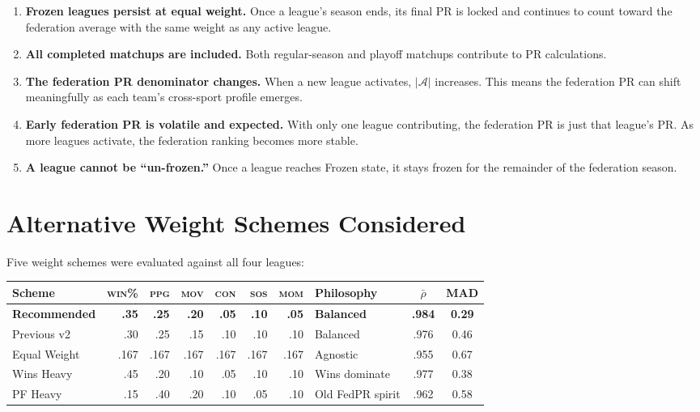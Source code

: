 \documentclass[11pt,a4paper]{article}
\begin{document}
\begin{enumerate}[nosep]
\item \textbf{Frozen leagues persist at equal weight.} Once a league's season ends, its final PR is locked and continues to count toward the federation average with the same weight as any active league.
\item \textbf{All completed matchups are included.} Both regular-season and playoff matchups contribute to PR calculations.
\item \textbf{The federation PR denominator changes.} When a new league activates, $|\mathcal{A}|$ increases. This means the federation PR can shift meaningfully as each team's cross-sport profile emerges.
\item \textbf{Early federation PR is volatile and expected.} With only one league contributing, the federation PR is just that league's PR. As more leagues activate, the federation ranking becomes more stable.
\item \textbf{A league cannot be ``un-frozen.''} Once a league reaches Frozen state, it stays frozen for the remainder of the federation season.
\end{enumerate}


\section{Alternative Weight Schemes Considered}\label{sec:altweights}

Five weight schemes were evaluated against all four leagues:

\begin{table}[H]
\centering
\begin{tabular}{@{}lrrrrrrlcc@{}}
\toprule
\textbf{Scheme} & \textsc{win\%} & \textsc{ppg} & \textsc{mov} & \textsc{con} & \textsc{sos} & \textsc{mom} & \textbf{Philosophy} & $\bar{\rho}$ & \textbf{MAD}\\
\midrule
\rowcolor{tablealt}
\textbf{Recommended} & \textbf{.35} & \textbf{.25} & \textbf{.20} & \textbf{.05} & \textbf{.10} & \textbf{.05} & \textbf{Balanced} & \textbf{.984} & \textbf{0.29}\\
Previous v2 & .30 & .25 & .15 & .10 & .10 & .10 & Balanced & .976 & 0.46\\
Equal Weight & .167 & .167 & .167 & .167 & .167 & .167 & Agnostic & .955 & 0.67\\
Wins Heavy & .45 & .20 & .10 & .05 & .10 & .10 & Wins dominate & .977 & 0.38\\
PF Heavy & .15 & .40 & .20 & .10 & .05 & .10 & Old FedPR spirit & .962 & 0.58\\
\bottomrule
\end{tabular}
\end{table}
\end{document}
